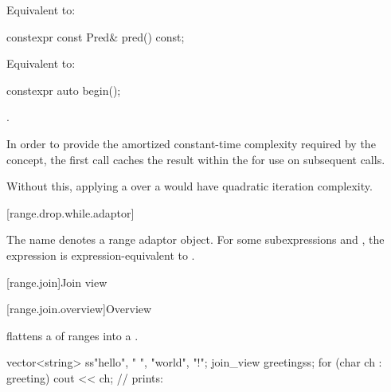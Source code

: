 \begin{itemdescr}
\pnum
\effects
Equivalent to: 
\end{itemdescr}

%
\begin{itemdecl}
constexpr const Pred& pred() const;
\end{itemdecl}

\begin{itemdescr}
\pnum
\effects
Equivalent to: 
\end{itemdescr}

%
\begin{itemdecl}
constexpr auto begin();
\end{itemdecl}

\begin{itemdescr}
\pnum
\returns
{}.

\pnum
\remarks
In order to provide the amortized constant-time complexity
required by the  concept,
the first call caches the result within the 
for use on subsequent calls.
\begin{note}
Without this,
applying a  over a 
would have quadratic iteration complexity.
\end{note}
\end{itemdescr}

[range.drop.while.adaptor]{}

\pnum
The name 
denotes a range adaptor object.
For some subexpressions  and ,
the expression 
is expression-equivalent to .

[range.join]{Join view}

[range.join.overview]{Overview}

\pnum
{} flattens a  of ranges into a
.

\pnum
\begin{example}
\begin{codeblock}
vector<string> ss{"hello", " ", "world", "!"};
join_view greeting{ss};
for (char ch : greeting)
  cout << ch;                                   // prints: 
\end{codeblock}
\end{example}

